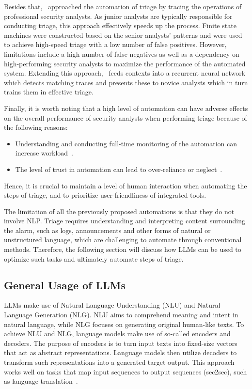 Besides that,\ \citet{zhong2018learning} approached the automation of triage by tracing the operations of professional
security analysts.
As junior analysts are typically responsible for conducting triage, this approach effectively speeds up the process.
Finite state machines were constructed based on the senior analysts' patterns and were used to achieve high-speed triage
with a low number of false positives.
However, limitations include a high number of false negatives as well as a dependency on high-performing security
analysts to maximize the performance of the automated system.
Extending this approach,\ \citet{lin2018data} feeds contexts into a recurrent neural network which detects matching
traces and presents these to novice analysts which in turn trains them in effective triage.

Finally, it is worth noting that a high level of automation can have adverse effects on the overall performance of
security analysts when performing triage because of the following reasons:
\begin{itemize}
    \item Understanding and conducting full-time monitoring of the automation can increase
    workload\ \citep{kaber2004effects}.
    \item The level of trust in automation can lead to over-reliance or neglect\ \citep{lee2004trust}.
\end{itemize}
Hence, it is crucial to maintain a level of human interaction when automating the steps of triage, and to prioritize
user-friendliness of integrated tools.

The limitation of all the previously proposed automations is that they do not involve NLP\@.
Triage requires understanding and interpreting content surrounding the alarm, such as logs, announcements and other
forms of natural or unstructured language, which are challenging to automate through conventional methods.
Therefore, the following section will discuss how LLMs can be used to optimize such tasks and ultimately automate steps
of triage.

\subsection{General Usage of LLMs}
\label{subsec:rq1-use-of-llms}

LLMs make use of Natural Language Understanding (NLU) and Natural Language Generation (NLG).
NLU aims to comprehend meaning and intent in natural language, while NLG focuses on generating original human-like
texts.
To achieve NLU and NLG, language models make use of so-called encoders and decoders.
The purpose of encoders is to turn input texts into fixed-size vectors that act as abstract representations.
Language models then utilize decoders to transform such representations into a generated target output.
This approach works well on tasks that map input sequences to output sequences (sec2sec), such as language
translation\ \citep{sutskever2014sequence, cho2014learning}.


